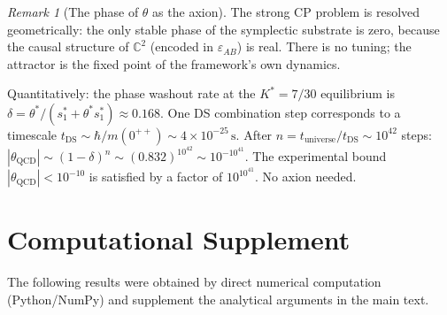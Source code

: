 \documentclass[11pt,a4paper]{article}
\theoremstyle{definition}
\theoremstyle{remark}
\newtheorem{remark}[theorem]{Remark}
\newcommand{\C}{\mathbb{C}}
\begin{document}
\begin{remark}[The phase of $\theta$ as the axion]
The strong CP problem is resolved geometrically: the only stable phase of the symplectic substrate is zero, because the causal structure of $\C^2$ (encoded in $\varepsilon_{AB}$) is real. There is no tuning; the attractor is the fixed point of the framework's own dynamics.

Quantitatively: the phase washout rate at the $K^*=7/30$ equilibrium is $\delta=\theta^*/(s_1^*+\theta^*s_1^*)\approx 0.168$. One DS combination step corresponds to a timescale $t_{\mathrm{DS}}\sim\hbar/m(0^{++})\sim 4\times 10^{-25}\,\mathrm{s}$. After $n=t_{\mathrm{universe}}/t_{\mathrm{DS}}\sim 10^{42}$ steps: $|\theta_\mathrm{QCD}|\sim(1-\delta)^n\sim(0.832)^{10^{42}}\sim 10^{-10^{41}}$. The experimental bound $|\theta_\mathrm{QCD}|<10^{-10}$ is satisfied by a factor of $10^{10^{41}}$. No axion needed.
\end{remark}

\section{Computational Supplement}\label{sec:supplement}

The following results were obtained by direct numerical computation (Python/NumPy) and supplement the analytical arguments in the main text.
\end{document}

